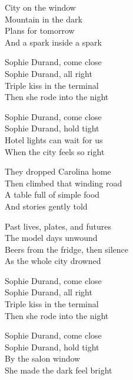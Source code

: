 \begin{lyrics}
City on the window\\
Mountain in the dark\\
Plans for tomorrow\\
And a spark inside a spark

Sophie Durand, come close\\
Sophie Durand, all right\\
Triple kiss in the terminal\\
Then she rode into the night

Sophie Durand, come close\\
Sophie Durand, hold tight\\
Hotel lights can wait for us\\
When the city feels so right

They dropped Carolina home\\
Then climbed that winding road\\
A table full of simple food\\
And stories gently told

Past lives, plates, and futures\\
The model days unwound\\
Beers from the fridge, then silence\\
As the whole city drowned

Sophie Durand, come close\\
Sophie Durand, all right\\
Triple kiss in the terminal\\
Then she rode into the night

Sophie Durand, come close\\
Sophie Durand, hold tight\\
By the salon window\\
She made the dark feel bright
\end{lyrics}

